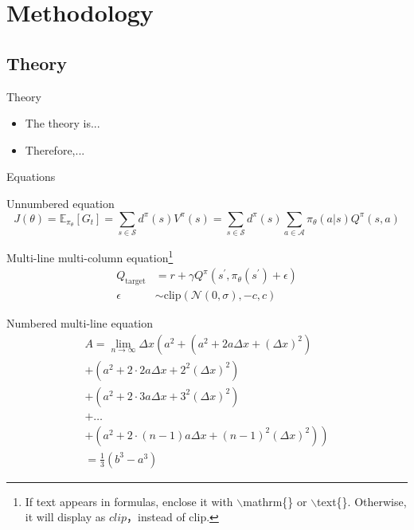 \documentclass{beamer}
\begin{document}
\section{Methodology}

\subsection{Theory}

\begin{frame}{Theory}
    \begin{itemize}
        \item The theory is...
        \item Therefore,...
    \end{itemize}
\end{frame}

\begin{frame}{Equations}
    \begin{exampleblock}{Unnumbered equation} %
        \begin{equation*}
            J(\theta) = \mathbb{E}_{\pi_\theta}[G_t] = \sum_{s\in\mathcal{S}} d^\pi (s)V^\pi(s)=\sum_{s\in\mathcal{S}} d^\pi(s)\sum_{a\in\mathcal{A}}\pi_\theta(a|s)Q^\pi(s,a)
        \end{equation*}
    \end{exampleblock}
    \begin{exampleblock}{Multi-line multi-column equation\footnote{If text appears in formulas, enclose it with $\backslash$mathrm\{\} or $\backslash$text\{\}. Otherwise, it will display as $clip$，instead of $\mathrm{clip}$.}}
        \begin{align}
            Q_\mathrm{target}&=r+\gamma Q^\pi(s^\prime, \pi_\theta(s^\prime)+\epsilon)\\
            \epsilon&\sim\mathrm{clip}(\mathcal{N}(0, \sigma), -c, c)\nonumber
        \end{align}
    \end{exampleblock}
\end{frame}

\begin{frame}
    \begin{exampleblock}{Numbered multi-line equation}
        \begin{multline}
            A=\lim_{n\rightarrow\infty}\Delta x\left(a^{2}+\left(a^{2}+2a\Delta x+\left(\Delta x\right)^{2}\right)\right.\label{eq:reset}\\
            +\left(a^{2}+2\cdot2a\Delta x+2^{2}\left(\Delta x\right)^{2}\right)\\
            +\left(a^{2}+2\cdot3a\Delta x+3^{2}\left(\Delta x\right)^{2}\right)\\
            +\ldots\\
            \left.+\left(a^{2}+2\cdot(n-1)a\Delta x+(n-1)^{2}\left(\Delta x\right)^{2}\right)\right)\\
            =\frac{1}{3}\left(b^{3}-a^{3}\right)
        \end{multline}
    \end{exampleblock}
\end{frame}
\end{document}
